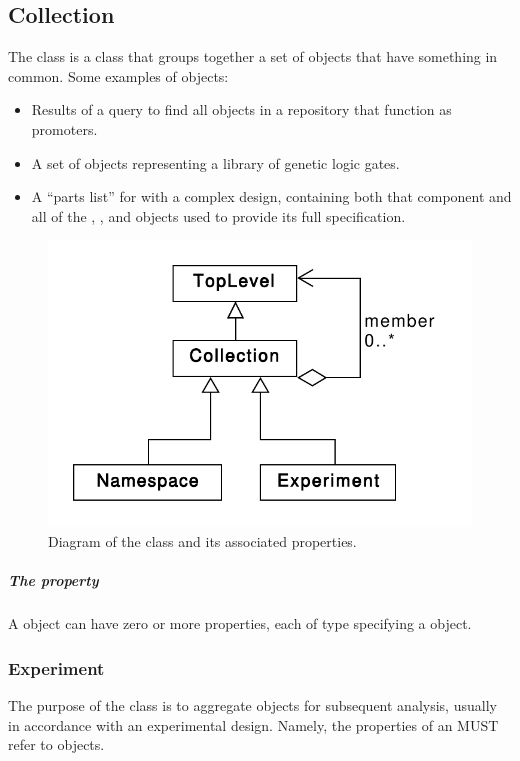 \subsection {Collection}
\label{sec:Collection}
The  class is a class that groups together a set of  objects that have something in common.
Some examples of  objects:
\begin{itemize}
\item Results of a query to find all  objects in a repository that function as promoters.
\item A set of  objects representing a library of genetic logic gates.
\item A ``parts list'' for  with a complex design, containing both that component and all of the , , and  objects used to provide its full specification.
\end{itemize}

\begin{figure}[ht]
\begin{center}
\includegraphics[scale=0.6]{uml/collection}
\caption[]{Diagram of the  class and its associated properties.}
\label{uml:collection}
\end{center}
\end{figure}

\subparagraph{The  property}\label{sec:member}
A  object can have zero or more  properties, each of type  specifying a  object.

\subsubsection{Experiment}
\label{sec:Experiment}

The purpose of the  class is to aggregate  objects for subsequent analysis, usually in accordance with an experimental design.  Namely, the  properties of an  MUST refer to  objects.

